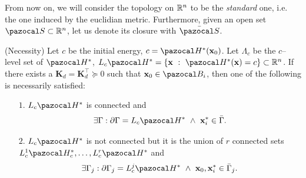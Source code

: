 From now on, we will consider the topology on $\mathbb{R}^n$ to be the \textit{standard} one, i.e. the one induced by the euclidian metric. Furthermore, given an open set $\Sa\subset\R^n$, let us denote its closure with $\bar{\Sa}$.
%
\begin{thm}(Necessity)\label{thm:necessity}
Let $c$ be the initial energy, $c = \Ha^*(\xb_0)$. Let $\Lambda_c$ be the $c$--level set of $\Ha^*$, $L_c\Ha^* = \{\xb~:~\Ha^*(\xb)=c\}\subset\R^n$. If there exists a $\mathbf{K}_d = \mathbf{K}_d^\top\succeq 0$ such that $\xb_0\in\B_i$, then one of the following is necessarily satisfied:
\begin{itemize}
    \item[$1.$] ${L}_c\Ha^*$ is connected and 
    \begin{equation}
    	\exists \Gamma:\partial \Gamma = L_c\Ha^* ~\land~ \xb_i^*\in \bar{\Gamma}.
    \end{equation}
    \item[$2.$] $L_c\Ha^*$ is not connected but it is the union of $r$ connected sets $L_c^1\Ha^*_c,\dots,L_c^r\Ha^*$ and
    \begin{equation}
    	\exists {\Gamma}_j:\partial \Gamma_j = L_c^j\Ha^* ~\land~ \xb_0,\xb_i^*\in \Bar{\Gamma}_j.
    \end{equation}
\end{itemize}
\end{thm}
%
